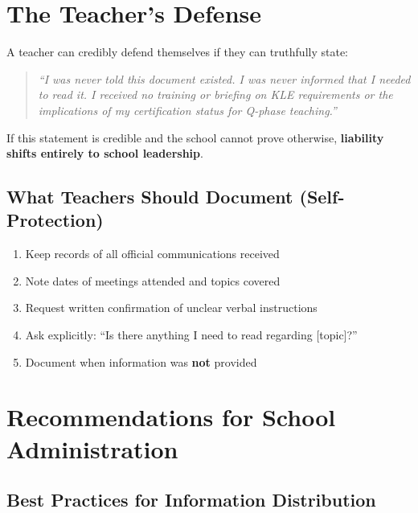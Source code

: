 \documentclass[11pt,a4paper]{article}
\begin{document}
\section{The Teacher's Defense}

\begin{infobox}
A teacher can credibly defend themselves if they can truthfully state:

\begin{quote}
\textit{``I was never told this document existed. I was never informed that I needed to read it. I received no training or briefing on KLE requirements or the implications of my certification status for Q-phase teaching.''}
\end{quote}

If this statement is credible and the school cannot prove otherwise, \textbf{liability shifts entirely to school leadership}.
\end{infobox}

\subsection{What Teachers Should Document (Self-Protection)}

\begin{enumerate}
    \item Keep records of all official communications received
    \item Note dates of meetings attended and topics covered
    \item Request written confirmation of unclear verbal instructions
    \item Ask explicitly: ``Is there anything I need to read regarding [topic]?''
    \item Document when information was \textbf{not} provided
\end{enumerate}

\section{Recommendations for School Administration}

\subsection{Best Practices for Information Distribution}
\end{document}
